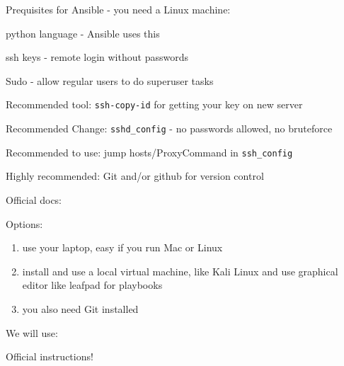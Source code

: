 \documentclass[18pt,landscape,a4paper,footrule]{foils}
\begin{document}
Prequisites for Ansible - you need a Linux machine:
\begin{list2}
\item python language - Ansible uses this
\item ssh keys - remote login without passwords
\item Sudo - allow regular users to do superuser tasks
\item Recommended tool: \verb+ssh-copy-id+ for getting your key on new server
\item Recommended Change: \verb+sshd_config+ - no passwords allowed, no bruteforce
\item Recommended to use: jump hosts/ProxyCommand in \verb+ssh_config+
\item Highly recommended: Git and/or github for version control
\end{list2}

Official docs:\\

Options:
\begin{enumerate}
\item use your laptop, easy if you run Mac or Linux
\item install and use a local virtual machine, like Kali Linux and use graphical editor like leafpad for playbooks
\item you also need Git installed
\end{enumerate}

We will use:


Official instructions!\\

\end{document}
